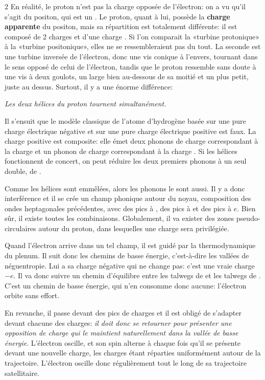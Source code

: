 \begin{multicols}{2}
En réalité, le
proton n'est pas la charge opposée de l'électron: on a vu qu'il
s'agit du positon, qui est un . Le proton, quant à lui,
possède la \textbf{charge apparente} du positon, mais sa répartition est
totalement différente: il est composé de 2 charges  et d'une
charge . Si l'on comparait la «turbine protonique» à la «turbine
positonique», elles ne se ressembleraient pas du tout. La seconde est une
turbine inversée de l'électron, donc une vis conique à l'envers,
tournant dans le sens opposé de celui de l'électron, tandis que le proton ressemble sans doute
à une vis à deux goulots, un large bien au-dessous de sa moitié et un
plus petit, juste au dessus. Surtout, il y a une énorme différence:

\textit{Les deux hélices du proton tournent simultanément.}

Il s'ensuit que le modèle classique de l'atome d'hydrogène basée sur une
pure charge électrique négative et sur une pure charge électrique positive
est faux. La charge positive est composite: elle émet deux phonons
de charge correspondant à la charge  et un phonon de charge
correspondant à la charge . Si les hélices  fonctionnent de
concert, on peut réduire les deux premiers phonons à un seul double,
de .

Comme les hélices sont emmêlées, alors les phonons le sont aussi. Il y
a donc interférence et il se crée un champ phonique autour du noyau,
composition des ondes heptagonales précédentes, avec des pics à ,
des pics à  et des pics à $e$. Bien sûr, il existe toutes les
combinaisons. Globalement, il va exister des zones pseudo-circulaires
autour du proton, dans lesquelles une charge sera privilégiée.

Quand l'électron arrive dans un tel champ, il est guidé par la
thermodynamique du plenum. Il suit donc les chemins de basse énergie,
c'est-à-dire les vallées de néguentropie. Lui a sa charge négative qui
ne change pas: c'est une vraie charge $-e$. Il va donc suivre un chemin
d'équilibre entre les talwegs de  et les talwegs de .
C'est un chemin de basse énergie, qui n'en consomme donc aucune:
l'électron orbite sans effort.

En revanche, il passe devant des pics de charges et il est obligé de
s'adapter devant chacune des charges: \textit{il doit donc se retourner pour
présenter une opposition de charge qui le maintient naturellement dans
la vallée de basse énergie}. L'électron oscille, et son spin alterne
à chaque fois qu'il se présente devant une nouvelle charge, les charges étant
réparties uniformément autour de la trajectoire. L'électron oscille
donc régulièrement tout le long de sa trajectoire satellitaire.


\end{multicols}
